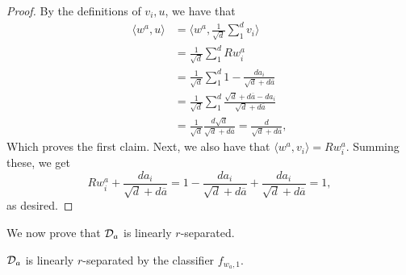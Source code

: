\begin{proof}
By the definitions of $v_i, u$, we have that 
\begin{equation*}
\begin{split}
\langle w^a, u \rangle &= \langle w^a, \frac{1}{\sqrt{d}}\sum_1^d v_i \rangle \\
&= \frac{1}{\sqrt{d}} \sum_1^d Rw_i^a \\
&= \frac{1}{\sqrt{d}} \sum_1^d 1 - \frac{da_i}{\sqrt{d} + d\overline{a}} \\
&= \frac{1}{\sqrt{d}} \sum_1^d \frac{\sqrt{d} + d\overline{a} - da_i}{\sqrt{d} + d\overline{a}} \\
&= \frac{1}{\sqrt{d}} \frac{d\sqrt{d}}{\sqrt{d} + d\overline{a}} = \frac{d}{\sqrt{d} + d\overline{a}},
\end{split}
\end{equation*}
Which proves the first claim. Next, we also have that $\langle w^a, v_i \rangle = Rw_i^a$. Summing these, we get $$Rw_i^a + \frac{da_i}{\sqrt{d} + d\overline{a}} = 1 - \frac{da_i}{\sqrt{d} + d\overline{a}} + \frac{da_i}{\sqrt{d} + d\overline{a}} = 1,$$ as desired. 
\end{proof}

We now prove that ${\mathcal D}_a$ is linearly $r$-separated.

\begin{lem}\label{lem:separation}
${\mathcal D}_a$ is linearly $r$-separated by the classifier $f_{w_a, 1}$.
\end{lem}

